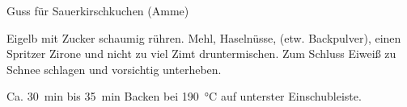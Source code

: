 \begin{MyRecipe}{Guss für Sauerkirschkuchen (Amme)}{}{}
	
	Eigelb mit Zucker schaumig rühren. Mehl, Haselnüsse, (etw. Backpulver), einen Spritzer Zirone und nicht zu viel Zimt druntermischen. Zum Schluss Eiweiß zu Schnee schlagen und vorsichtig unterheben.\par\bigskip
	
	Ca. \SI{30}{\minute} bis \SI{35}{\minute} Backen bei \SI{190}{\degreeCelsius} auf unterster Einschubleiste.
	
\end{MyRecipe}